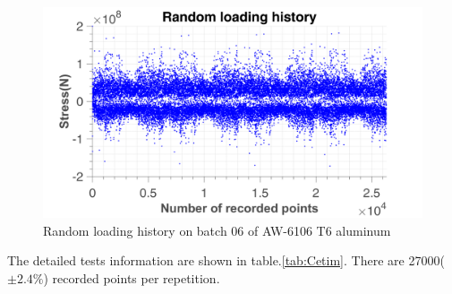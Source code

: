 \begin{figure}[!h]
\centering
\includegraphics[width=\textwidth]{figures//EP_a_06_random.png} 
\caption{Random loading history on batch 06 of AW-6106 T6 aluminum}
\end{figure}	
The detailed tests information are shown in table.\ref{tab:Cetim}. There are 27000($\pm 2.4\%$) recorded points per repetition. 

